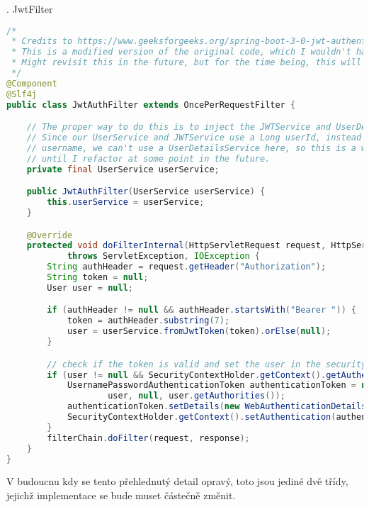 \null{}. JwtFilter

\begin{lstlisting}[language=Java]
/*
 * Credits to https://www.geeksforgeeks.org/spring-boot-3-0-jwt-authentication-with-spring-security-using-mysql-database/
 * This is a modified version of the original code, which I wouldn't have had figured out by my self in a reasonable amount of time.
 * Might revisit this in the future, but for the time being, this will do.
 */
@Component
@Slf4j
public class JwtAuthFilter extends OncePerRequestFilter {

    // The proper way to do this is to inject the JWTService and UserDetailsService.
    // Since our UserService and JWTService use a Long userId, instead of a
    // username, we can't use a UserDetailsService here, so this is a workaround
    // until I refactor at some point in the future.
    private final UserService userService;

    public JwtAuthFilter(UserService userService) {
        this.userService = userService;
    }

    @Override
    protected void doFilterInternal(HttpServletRequest request, HttpServletResponse response, FilterChain filterChain)
            throws ServletException, IOException {
        String authHeader = request.getHeader("Authorization");
        String token = null;
        User user = null;

        if (authHeader != null && authHeader.startsWith("Bearer ")) {
            token = authHeader.substring(7);
            user = userService.fromJwtToken(token).orElse(null);
        }

        // check if the token is valid and set the user in the security context
        if (user != null && SecurityContextHolder.getContext().getAuthentication() == null) {
            UsernamePasswordAuthenticationToken authenticationToken = new UsernamePasswordAuthenticationToken(
                    user, null, user.getAuthorities());
            authenticationToken.setDetails(new WebAuthenticationDetailsSource().buildDetails(request));
            SecurityContextHolder.getContext().setAuthentication(authenticationToken);
        }
        filterChain.doFilter(request, response);
    }
}
\end{lstlisting}

V budoucnu kdy se tento přehlednutý detail opravý, toto jsou jediné dvě třídy,
jejichž implementace se bude muset částečně změnit.
